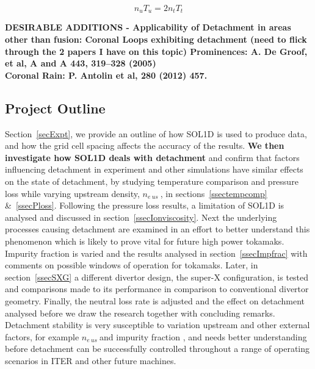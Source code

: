 \documentclass[12pt]{article}  %
\providecommand{\neus}{$n_{e~us}~$} %
\begin{document}
  \begin{equation}\label{eqPus_tg}
  n_uT_u = 2n_tT_t
  \end{equation}

\textbf{DESIRABLE ADDITIONS - Applicability of Detachment in areas other than fusion: Coronal Loops exhibiting detachment (need to flick through the 2 papers I have on this topic) 
Prominences: A. De Groof, et al, A and A 443, 319–328 (2005)}\\

\textbf{Coronal Rain: P. Antolin et al, 280 (2012) 457.}\\

\subsection{Project Outline}\label{ssecOutline}
Section~\ref{secExpt}, we provide an outline of how SOL1D is used to produce data, and how the grid cell spacing affects the accuracy of the results. \textbf{We then investigate how SOL1D deals with detachment} and confirm that factors influencing detachment in experiment and other simulations have similar effects on the state of detachment, by studying temperature comparison and pressure loss while varying upstream density, \neus, in sections~\ref{ssectempcomp} \&~\ref{ssecPloss}. Following the pressure loss results, a limitation of SOL1D is analysed and discussed in section~\ref{ssecIonviscosity}.  Next the underlying processes causing detachment are examined in an effort to better understand this phenomenon which is likely to prove vital for future high power tokamaks. Impurity fraction is varied and the results analysed in section~\ref{ssecImpfrac} with comments on possible windows of operation for tokamaks. Later, in section~\ref{ssecSXG} a different divertor design, the super-X configuration, is tested and comparisons made to its performance in comparison to conventional divertor geometry. Finally, the neutral loss rate is adjusted and the effect on detachment analysed before we draw the research together with concluding remarks. Detachment stability is very susceptible to variation upstream and other external factors, for example \neus and impurity fraction \cite{Lipschultz2016}, and needs better understanding before detachment can be successfully controlled throughout a range of operating scenarios in ITER and other future machines. 
\end{document}
